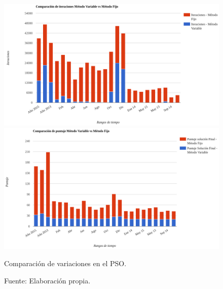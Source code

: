 \begin{figure}[ht!]
    \centering
    \captionsetup{justification=centering,margin=2cm}
        \includegraphics[width=\textwidth]{figures/comp_v1_v2_iteraciones.png}
        \includegraphics[width=\textwidth]{figures/comp_v1_v2_puntaje.png} 
    \caption{Comparación de variaciones en el PSO.}
    \caption*{Fuente: Elaboración propia.}
    \label{fig:comparison_pso_1}
\end{figure}

